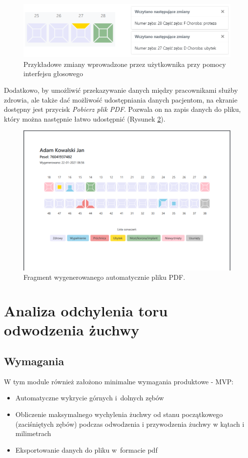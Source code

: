 \begin{figure}[ht!]
\centering\includegraphics[width=130mm]{figures/zmiany.PNG}
\caption{Przykładowe zmiany wprowadzone przez użytkownika przy pomocy interfejsu głosowego}
\label{fig:zmiany}
\end{figure}

Dodatkowo, by umożliwić przekazywanie danych między pracownikami służby zdrowia, ale także dać możliwość udostępniania danych pacjentom, na ekranie dostępny jest przycisk \textit{Pobierz plik PDF}. Pozwala on na zapis danych do pliku, który można następnie łatwo udostępnić (Rysunek \ref{fig:pdf}).

\begin{figure}[ht!]
\centering\includegraphics[width=130mm]{figures/pdf.png}
\caption{Fragment wygenerowanego automatycznie pliku PDF.}
\label{fig:pdf}
\end{figure}


\section{Analiza odchylenia toru odwodzenia żuchwy}
\subsection{Wymagania}
W tym module również założono minimalne wymagania produktowe - MVP:
\begin{itemize}
    \item Automatyczne wykrycie górnych i~dolnych zębów
    \item Obliczenie maksymalnego wychylenia żuchwy od stanu początkowego (zaciśniętych zębów) podczas odwodzenia i przywodzenia żuchwy w kątach i milimetrach
    \item Eksportowanie danych do pliku w~formacie pdf
\end{itemize} 
